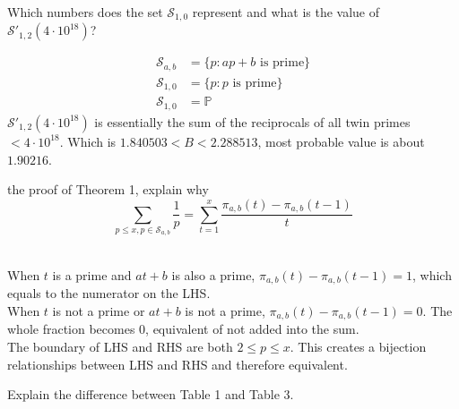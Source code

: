\documentclass{article}
\begin{document}
\begin{custom-big}[Problem C.2 (b)]
Which numbers does the set $\mathcal{S}_{1,0}$ represent and what is the value of $\mathcal{S}'_{1,2}\left(4\cdot 10^{18}\right)$?
\end{custom-big}

\begin{solution}
\begin{align*}
    \mathcal S_{a,b}&=\{p:ap+b\text{ is prime}\}\\
    \mathcal S_{1,0}&=\{p:p\text{ is prime}\}\\
    \mathcal S_{1,0}&=\mathbb P
\end{align*}
$\mathcal S'_{1,2}\left(4\cdot 10^{18}\right)$ is essentially the sum of the reciprocals of all twin primes $<4\cdot 10^{18}$. Which is $ 1.840503 < B < 2.288513$, most probable value is about $1.90216$.
\end{solution}

\begin{custom-big}[Problem C.2]
the proof of Theorem 1, explain why 
\[
\sum_{p\leq x,p\in\mathcal S_{a,b}}\frac 1p=\sum^x_{t=1}\frac{\pi_{a,b}(t)-\pi_{a,b}(t-1)}{t}
\]
\end{custom-big}

\begin{solution}[Bijection]\\
When $t$ is a prime and $at+b$ is also a prime, $\pi_{a,b}(t)-\pi_{a,b}(t-1)=1$, which equals to the numerator on the LHS.\\
When $t$ is not a prime or $at+b$ is not a prime, $\pi_{a,b}(t)-\pi_{a,b}(t-1)=0$. The whole fraction becomes 0, equivalent of not added into the sum. \\
The boundary of LHS and RHS are both $2\leq p\leq x$. This creates a bijection relationships between LHS and RHS and therefore equivalent. 
\end{solution}

\pagebreak
\begin{custom-big}[Problem C.2]
Explain the difference between Table 1 and Table 3.
\end{custom-big}
\end{document}
